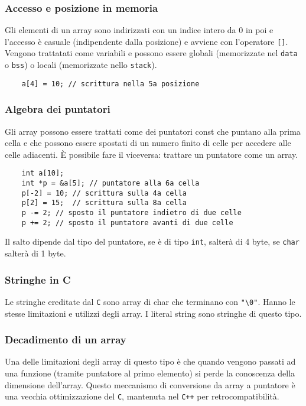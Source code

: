 \documentclass[a4paper]{article}
\begin{document}
\subsubsection*{Accesso e posizione in memoria}
Gli elementi di un array sono indirizzati con un indice intero da 0 in poi e l'accesso è casuale (indipendente dalla posizione)
e avviene con l'operatore \verb|[]|. Vengono trattatati come variabili e possono essere globali (memorizzate nel \verb|data| o
\verb|bss|) o locali (memorizzate nello \verb|stack|).
\begin{lstlisting}
	a[4] = 10; // scrittura nella 5a posizione
\end{lstlisting}

\subsubsection*{Algebra dei puntatori}
Gli array possono essere trattati come dei puntatori const che puntano alla prima cella e che possono essere spostati di un
numero finito di celle per accedere alle celle adiacenti. È possibile fare il viceversa: trattare un puntatore come un array.
\begin{lstlisting}
	int a[10];
	int *p = &a[5]; // puntatore alla 6a cella
	p[-2] = 10; // scrittura sulla 4a cella
	p[2] = 15;  // scrittura sulla 8a cella
	p -= 2; // sposto il puntatore indietro di due celle
	p += 2; // sposto il puntatore avanti di due celle 
\end{lstlisting}
Il salto dipende dal tipo del puntatore, se è di tipo \verb|int|, salterà di 4 byte, se \verb|char| salterà di 1 byte.

\subsubsection*{Stringhe in C}
Le stringhe ereditate dal \verb|C| sono array di char che terminano con \verb|"\0"|. Hanno le stesse limitazioni e utilizzi
degli array. I literal string sono stringhe di questo tipo.

\subsubsection*{Decadimento di un array}
Una delle limitazioni degli array di questo tipo è che quando vengono passati ad una funzione (tramite puntatore al primo
elemento) si perde la conoscenza della dimensione dell'array. Questo meccanismo di conversione da array a puntatore è una
vecchia ottimizzazione del \verb|C|, mantenuta nel \verb|C++| per retrocompatibilità.
\end{document}

